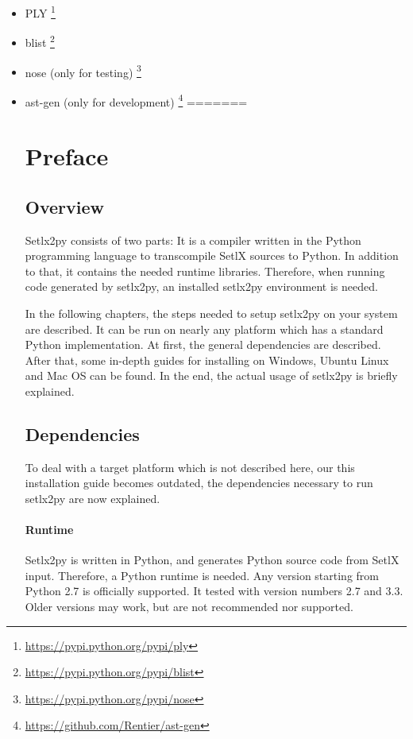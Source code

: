 \begin{itemize}
\item PLY \footnote{\url{https://pypi.python.org/pypi/ply}}
\item blist \footnote{\url{https://pypi.python.org/pypi/blist}}
\item nose (only for testing) \footnote{\url{https://pypi.python.org/pypi/nose}}
\item ast-gen (only for development) \footnote{\url{https://github.com/Rentier/ast-gen}}
=======
\section{Preface}

\subsection{Overview}

Setlx2py consists of two parts: It is a compiler written in the Python programming language to transcompile SetlX sources to Python. In addition to that, it contains the needed runtime libraries. Therefore, when running code generated by setlx2py, an installed setlx2py environment is needed. 

In the following chapters, the steps needed to setup setlx2py on your system are described. It can be run on nearly any platform which has a standard Python implementation. At first, the general dependencies are described. After that, some in-depth guides for installing on Windows, Ubuntu Linux and Mac OS can be found. In the end, the actual usage of setlx2py is briefly explained.

\subsection{Dependencies}

To deal with a target platform which is not described here, our this installation guide becomes outdated, the dependencies necessary to run setlx2py are now explained.

\paragraph{Runtime}

Setlx2py is written in Python, and generates Python source code from SetlX input. Therefore, a Python runtime is needed. Any version starting from Python 2.7 is officially supported. It tested with version numbers 2.7 and 3.3. Older versions may work, but are not recommended nor supported.


\end{itemize}
